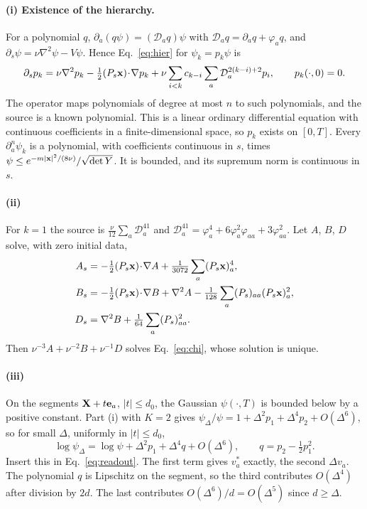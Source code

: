 \paragraph{(i) Existence of the hierarchy.}
For a polynomial $q$, $\partial_a(q\psi)=(\mathcal D_aq)\psi$ with
$\mathcal D_aq=\partial_aq+\varphi_aq$, and $\partial_s\psi=\nu\nabla^2\psi-V\psi$. Hence
Eq.~\eqref{eq:hier} for $\psi_k=p_k\psi$ is
\[
 \partial_sp_k=\nu\nabla^2p_k-\tfrac12(P_s\mathbf x)\!\cdot\!\nabla p_k
 +\nu\sum_{i<k}c_{k-i}\sum_a\mathcal D_a^{2(k-i)+2}p_i,\qquad p_k(\cdot,0)=0 .
\]
The operator maps polynomials of degree at most $n$ to such polynomials, and the source is a
known polynomial. This is a linear ordinary differential equation with continuous
coefficients in a finite-dimensional space, so $p_k$ exists on $[0,T]$. Every
$\partial_a^n\psi_k$ is a polynomial, with coefficients continuous in $s$, times
$\psi\le e^{-m|\mathbf x|^2/(8\nu)}/\sqrt{\det Y}$. It is bounded, and its supremum norm is continuous in $s$.

\paragraph{(ii)} For $k=1$ the source is
$\tfrac\nu{12}\sum_a\mathcal D_a^41$ and
$\mathcal D_a^41=\varphi_a^4+6\varphi_a^2\varphi_{aa}+3\varphi_{aa}^2$. Let $A$, $B$, $D$ solve, with zero
initial data,
\begin{equation}
\begin{aligned}
 A_s&=-\tfrac12(P_s\mathbf x)\!\cdot\!\nabla A+\tfrac1{3072}\sum_a(P_s\mathbf x)_a^4,\\
 B_s&=-\tfrac12(P_s\mathbf x)\!\cdot\!\nabla B+\nabla^2A-\tfrac1{128}\sum_a(P_s)_{aa}(P_s\mathbf x)_a^2,\\
 D_s&=\nabla^2B+\tfrac1{64}\sum_a(P_s)_{aa}^2 .
\end{aligned}
\label{eq:abd}
\end{equation}
Then $\nu^{-3}A+\nu^{-2}B+\nu^{-1}D$ solves Eq.~\eqref{eq:chi}, whose solution is unique.

\paragraph{(iii)}
On the segments $\mathbf X+t\mathbf e_a$, $|t|\le d_0$, the Gaussian $\psi(\cdot,T)$ is bounded below by a
positive constant. Part (i) with $K=2$ gives
$\psi_\Delta/\psi=1+\Delta^2p_1+\Delta^4p_2+O(\Delta^6)$, so for small $\Delta$, uniformly in $|t|\le d_0$,
\[
 \log\psi_\Delta=\log\psi+\Delta^2p_1+\Delta^4q+O(\Delta^6),\qquad q=p_2-\tfrac12p_1^2 .
\]
Insert this in Eq.~\eqref{eq:readout}. The first term gives $v_a^*$ exactly, the second $\Delta v_a$. The polynomial $q$ is Lipschitz on the
segment, so the third contributes $O(\Delta^4)$ after division by $2d$. The last contributes
$O(\Delta^6)/d=O(\Delta^5)$ since $d\ge\Delta$.

